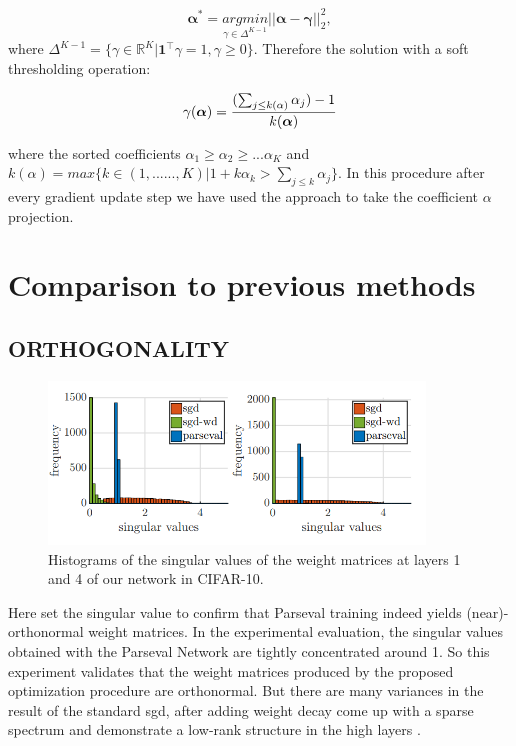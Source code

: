 $${\boldsymbol\alpha}^* = \underset{\gamma \in \Delta^{K-1}}{argmin}||\boldsymbol{\alpha-\gamma}||_2^2,$$
where $\Delta^{K-1} = \{\gamma\in\mathbb{R}^K|\boldsymbol{1}^\top \gamma = 1, \gamma \geq 0\}$. Therefore the solution with a soft thresholding operation: 

$$\gamma(\boldsymbol{\alpha}) = {{(\sum_{j\leq k(\alpha)}\alpha_j)-1}\over{k(\boldsymbol\alpha)}}$$

where the sorted coefficients $\alpha_1\geq \alpha_2\geq...\alpha_K$ and $k(\alpha)=max\{k\in(1,......,K)|1+k\alpha_k>\sum_{j\leq k}\alpha_j\}$. In this procedure after every gradient update step we have used the approach \cite{duchi2008efficient} to take the coefficient $\alpha$ projection. 

\chapter{Comparison to previous methods}

\section{ORTHOGONALITY}

\begin{figure}
  \begin{center}
    \includegraphics[width=10cm]{image/singular_values_of_the_weight_matrices.png}
  \end{center}
  \caption{Histograms of the singular values of the weight matrices
at layers 1 and 4 of our network in CIFAR-10.}
\end{figure}

Here set the singular value to confirm that Parseval training indeed yields (near)-orthonormal weight matrices. In the experimental evaluation, the singular values obtained with the Parseval Network are tightly concentrated around 1. So this experiment validates that the weight matrices produced by the proposed optimization procedure are orthonormal. But there are many variances in the result of the standard sgd, after adding weight decay come up with a sparse spectrum and demonstrate a low-rank structure in the high layers \cite{denton2014exploiting}.

